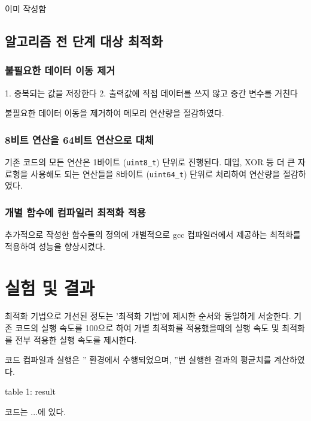 이미 작성함

\subsection{알고리즘 전 단계 대상 최적화}

\subsubsection{불필요한 데이터 이동 제거}

1. 중복되는 값을 저장한다 
2. 출력값에 직접 데이터를 쓰지 않고 중간 변수를 거친다

불필요한 데이터 이동을 제거하여 메모리 연산량을 절감하였다.

\subsubsection{8비트 연산을 64비트 연산으로 대체}

기존 코드의 모든 연산은 1바이트 (\texttt{uint8_t}) 단위로 진행된다. 
대입, XOR 등 더 큰 자료형을 사용해도 되는 연산들을 8바이트 (\texttt{uint64_t}) 단위로 처리하여 연산량을 절감하였다.

\subsubsection{개별 함수에 컴파일러 최적화 적용}

추가적으로 작성한 함수들의 정의에 개별적으로 
gcc 컴파일러에서 제공하는 최적화를 적용하여 성능을 향상시켰다.

\section{실험 및 결과}

최적화 기법으로 개선된 정도는 '최적화 기법'에 제시한 순서와 동일하게 서술한다.
기존 코드의 실행 속도를 100으로 하여 개별 최적화를 적용했을때의 실행 속도 및 
최적화를 전부 적용한 실행 속도를 제시한다.

코드 컴파일과 실행은 '' 환경에서 수행되었으며, ''번 실행한 결과의 평균치를 계산하였다.

table 1: result

코드는 ...에 있다.